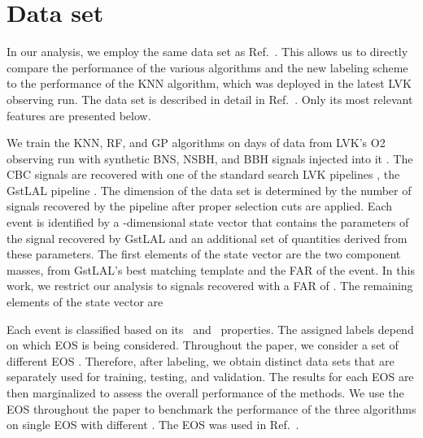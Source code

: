 \section{Data set\label{dataset}}
\label{sec:dataset}

In our analysis, we employ the same data set as Ref.\ . This allows us to directly compare the performance of the various algorithms and the new labeling
scheme to the performance of the \ac{KNN} algorithm, which was deployed in the latest \ac{LVK} observing run. The data set is described in detail in Ref.\ . Only its most relevant features are presented below.

We train the \ac{KNN}, \ac{RF}, and \ac{GP} algorithms on  days of data from \ac{LVK}'s \ac{O2} observing run with  synthetic \ac{BNS}, \ac{NSBH}, and \ac{BBH} signals
injected into it .  The \ac{CBC} signals are recovered with one of the standard search \ac{LVK} pipelines , the GstLAL
pipeline .  The dimension of the data set is determined by the number of signals recovered by the pipeline after
proper selection cuts are applied. Each event is identified by a -dimensional state vector that contains the parameters of the signal recovered by GstLAL and an additional set of
quantities derived from these parameters. The first  elements of the state vector are the two component masses,  from GstLAL's best matching
template and the \ac{FAR} of the event. In this work, we restrict our analysis to signals recovered with a \ac{FAR} of .  The remaining elements of the state
vector are  

Each event is classified based on its \hasns\ and \hasrem\ properties. The assigned labels depend on which \ac{EOS} is being considered. Throughout the paper, we consider a set of 
different EOS .  Therefore, after labeling, we obtain  distinct data sets that are separately used for training, testing, and
validation. The results for each \ac{EOS} are then marginalized to assess the overall performance of the methods. We use the  \ac{EOS} throughout the paper to benchmark
the performance of the three algorithms on single \ac{EOS} with different . The  \ac{EOS} was used in Ref.\ .

